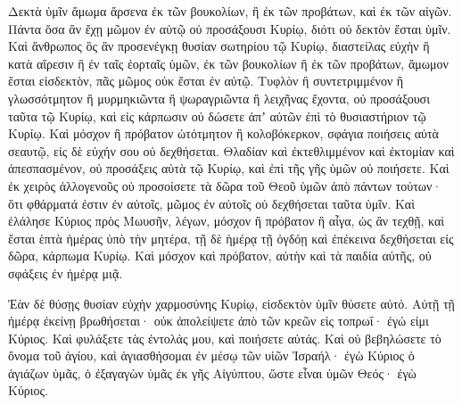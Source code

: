 {Δεκτὰ ὑμῖν ἄμωμα ἄρσενα ἐκ τῶν βουκολίων, ἢ ἐκ τῶν προβάτων, καὶ ἐκ τῶν αἰγῶν.
Πάντα ὅσα ἂν ἔχῃ μῶμον ἐν αὐτῷ οὐ προσάξουσι Κυρίῳ, διότι οὐ δεκτὸν ἔσται ὑμῖν.
Καὶ ἄνθρωπος ὃς ἂν προσενέγκῃ θυσίαν σωτηρίου τῷ Κυρίῳ, διαστείλας εὐχὴν ἢ κατὰ αἵρεσιν ἢ ἐν ταῖς ἑορταῖς ὑμῶν, ἐκ τῶν βουκολίων ἢ ἐκ τῶν προβάτων, ἄμωμον ἔσται εἰσδεκτὸν, πᾶς μῶμος οὐκ ἔσται ἐν αὐτῷ.
Τυφλὸν ἢ συντετριμμένον ἢ γλωσσότμητον ἢ μυρμηκιῶντα ἢ ψωραγριῶντα ἢ λειχῆνας ἔχοντα, οὐ προσάξουσι ταῦτα τῷ Κυρίῳ, καὶ εἰς κάρπωσιν οὐ δώσετε ἀπʼ αὐτῶν ἐπὶ τὸ θυσιαστήριον τῷ Κυρίῳ.
Καὶ μόσχον ἢ πρόβατον ὠτότμητον ἢ κολοβόκερκον, σφάγια ποιήσεις αὐτὰ σεαυτῷ, εἰς δὲ εὐχήν σου οὐ δεχθήσεται.
Θλαδίαν καὶ ἐκτεθλιμμένον καὶ ἐκτομίαν καὶ ἀπεσπασμένον, οὐ προσάξεις αὐτὰ τῷ Κυρίῳ, καὶ ἐπὶ τῆς γῆς ὑμῶν οὐ ποιήσετε.
Καὶ ἐκ χειρὸς ἀλλογενοῦς οὐ προσοίσετε τὰ δῶρα τοῦ Θεοῦ ὑμῶν ἀπὸ πάντων τούτων· ὅτι φθάρματά ἐστιν ἐν αὐτοῖς, μῶμος ἐν αὐτοῖς οὐ δεχθήσεται ταῦτα ὑμῖν.
Καὶ ἐλάλησε Κύριος πρὸς Μωυσῆν, λέγων,
μόσχον ἢ πρόβατον ἢ αἶγα, ὡς ἂν τεχθῇ, καὶ ἔσται ἑπτὰ ἡμέρας ὑπὸ τὴν μητέρα, τῇ δὲ ἡμέρᾳ τῇ ὀγδόῃ καὶ ἐπέκεινα δεχθήσεται εἰς δῶρα, κάρπωμα Κυρίῳ.
Καὶ μόσχον καὶ πρόβατον, αὐτὴν καὶ τὰ παιδία αὐτῆς, οὐ σφάξεις ἐν ἡμέρᾳ μιᾷ.
\par }{\PP {}Ἐὰν δὲ θύσῃς θυσίαν εὐχὴν χαρμοσύνης Κυρίῳ, εἰσδεκτὸν ὑμῖν θύσετε αὐτό.
Αὐτῇ τῇ ἡμέρᾳ ἐκείνῃ βρωθήσεται· οὐκ ἀπολείψετε ἀπὸ τῶν κρεῶν εἰς τοπρωΐ· ἐγώ εἰμι Κύριος.
Καὶ φυλάξετε τὰς ἐντολάς μου, καὶ ποιήσετε αὐτάς.
Καὶ οὐ βεβηλώσετε τὸ ὄνομα τοῦ ἁγίου, καὶ ἁγιασθήσομαι ἐν μέσῳ τῶν υἱῶν Ἰσραήλ· ἐγὼ Κύριος ὁ ἁγιάζων ὑμᾶς,
ὁ ἐξαγαγὼν ὑμᾶς ἐκ γῆς Αἰγύπτου, ὥστε εἶναι ὑμῶν Θεός· ἐγὼ Κύριος.

}
